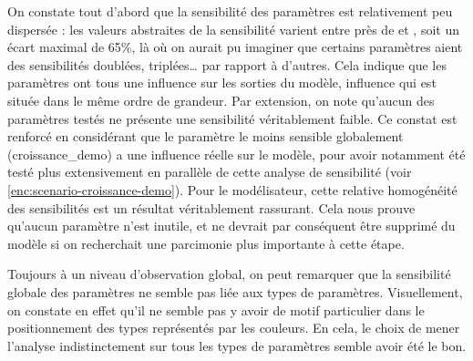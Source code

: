 On constate tout d'abord que la sensibilité des paramètres est relativement peu dispersée : les valeurs abstraites de la sensibilité varient entre près de \fg{} et \fg{}, soit un écart maximal de 65\%, là où on aurait pu imaginer que certains paramètres aient des sensibilités doublées, triplées\ldots{} par rapport à d'autres.
Cela indique que les paramètres ont tous une influence sur les sorties du modèle, influence qui est située dans le même ordre de grandeur.
Par extension, on note qu'aucun des paramètres testés ne présente une sensibilité véritablement faible.
Ce constat est renforcé en considérant que le paramètre le moins sensible globalement (\textsf{croissance\_demo}) a une influence réelle sur le modèle, pour avoir notamment été testé plus extensivement en parallèle de cette analyse de sensibilité (voir \cref{enc:scenario-croissance-demo}).
Pour le modélisateur, cette relative homogénéité des sensibilités est un résultat véritablement rassurant.
Cela nous prouve qu'aucun paramètre n'est inutile, et ne devrait par conséquent être supprimé du modèle si on recherchait une parcimonie plus importante à cette étape.

Toujours à un niveau d'observation global, on peut remarquer que la sensibilité globale des paramètres ne semble pas liée aux types de paramètres.
Visuellement, on constate en effet qu'il ne semble pas y avoir de motif particulier dans le positionnement des types représentés par les couleurs.
En cela, le choix de mener l'analyse indistinctement sur tous les types de paramètres semble avoir été le bon.

